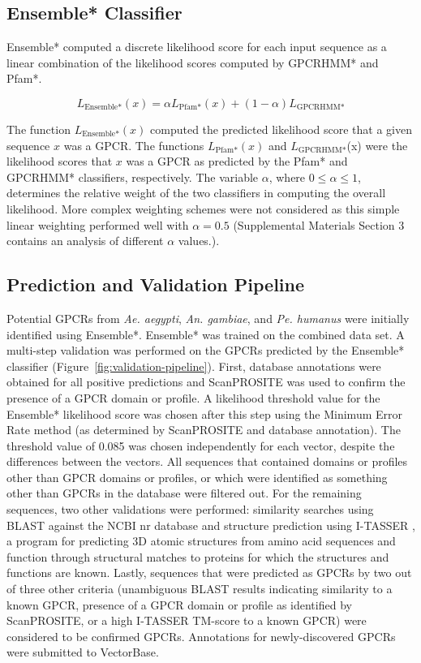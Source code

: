 \subsection{Ensemble* Classifier}
Ensemble* computed a discrete likelihood score for each input sequence as a linear combination of the likelihood scores computed by GPCRHMM* and Pfam*.

\begin{equation*}
L_{\text{Ensemble*}}(x) = \alpha L_{\text{Pfam*}}(x) + (1 - \alpha) L_{\text{GPCRHMM*}}
\end{equation*}

The function $L_{\text{Ensemble*}}(x)$ computed the predicted likelihood score that a given sequence $x$ was a GPCR. The functions $L_{\text{Pfam*}}(x)$ and $L_{\text{GPCRHMM*}}$(x) were the likelihood scores that $x$ was a GPCR as predicted by the Pfam* and GPCRHMM* classifiers, respectively. The variable $\alpha$, where $0 \le \alpha \le 1$, determines the relative weight of the two classifiers in computing the overall likelihood. More complex weighting schemes were not considered as this simple linear weighting performed well with $\alpha = 0.5$ (Supplemental Materials Section 3 contains an analysis of different $\alpha$ values.).

\subsection{Prediction and Validation Pipeline}
Potential GPCRs from \emph{Ae. aegypti}, \emph{An. gambiae}, and \emph{Pe. humanus} were initially identified using Ensemble*.  Ensemble* was trained on the combined data set.  A multi-step validation was performed on the GPCRs predicted by the Ensemble* classifier (Figure~\ref{fig:validation-pipeline}). First, database annotations were obtained for all positive predictions and ScanPROSITE \cite{Gattiker2002} was used to confirm the presence of a GPCR domain or profile. A likelihood threshold value for the Ensemble* likelihood score was chosen after this step using the Minimum Error Rate method \cite{Wistrand2006} (as determined by ScanPROSITE and database annotation). The threshold value of 0.085 was chosen independently for each vector, despite the differences between the vectors. All sequences that contained domains or profiles other than GPCR domains or profiles, or which were identified as something other than GPCRs in the database were filtered out. For the remaining sequences, two other validations were performed: similarity searches using BLAST against the NCBI nr database \cite{Pruitt2007} and structure prediction using I-TASSER \cite{Zhang2007, Roy2010}, a program for predicting 3D atomic structures from amino acid sequences and function through structural matches to proteins for which the structures and functions are known.  Lastly, sequences that were predicted as GPCRs by two out of three other criteria (unambiguous BLAST results indicating similarity to a known GPCR, presence of a GPCR domain or profile as identified by ScanPROSITE, or a high I-TASSER TM-score to a known GPCR) were considered to be confirmed GPCRs. Annotations for newly-discovered GPCRs were submitted to VectorBase.

